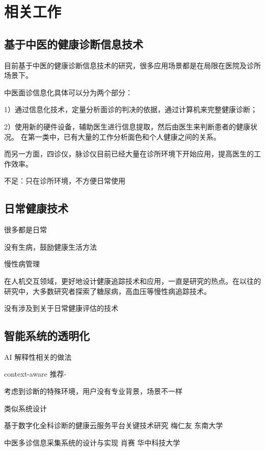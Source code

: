 \chapter{相关工作}

\section{基于中医的健康诊断信息技术}

目前基于中医的健康诊断信息技术的研究，很多应用场景都是在局限在医院及诊所场景下。

中医面诊信息化具体可以分为两个部分：

1）通过信息化技术，定量分析面诊的判决的依据，通过计算机来完整健康诊断；

2）使用新的硬件设备，辅助医生进行信息提取，然后由医生来判断患者的健康状况。
在第一类中，已有大量的工作分析面色和个人健康之间的关系。

而另一方面，四诊仪，脉诊仪目前已经大量在诊所环境下开始应用，提高医生的工作效率。

不足：只在诊所环境，不方便日常使用

\section{日常健康技术}



很多都是日常

没有生病，鼓励健康生活方法

慢性病管理

在人机交互领域，更好地设计健康追踪技术和应用，一直是研究的热点。在以往的研究中，大多数研究者探索了糖尿病，高血压等慢性病追踪技术。




没有涉及到关于日常健康评估的技术

\section{智能系统的透明化}

AI 解释性相关的做法

context-aware
推荐-

考虑到诊断的特殊环境，用户没有专业背景，场景不一样


类似系统设计

基于数字化全科诊断的健康云服务平台关键技术研究 梅仁友 东南大学

中医多诊信息采集系统的设计与实现 肖赛 华中科技大学